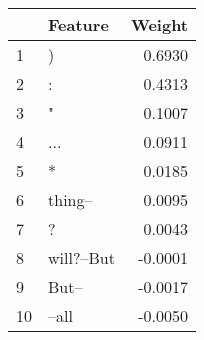 \begin{tabular}{llr}
\toprule
{} &     Feature &  Weight \\
\midrule
1  &           ) &  0.6930 \\
2  &           : &  0.4313 \\
3  &           " &  0.1007 \\
4  &         ... &  0.0911 \\
5  &           * &  0.0185 \\
6  &     thing-- &  0.0095 \\
7  &           ? &  0.0043 \\
8  &  will?--But & -0.0001 \\
9  &       But-- & -0.0017 \\
10 &       --all & -0.0050 \\
\bottomrule
\end{tabular}
